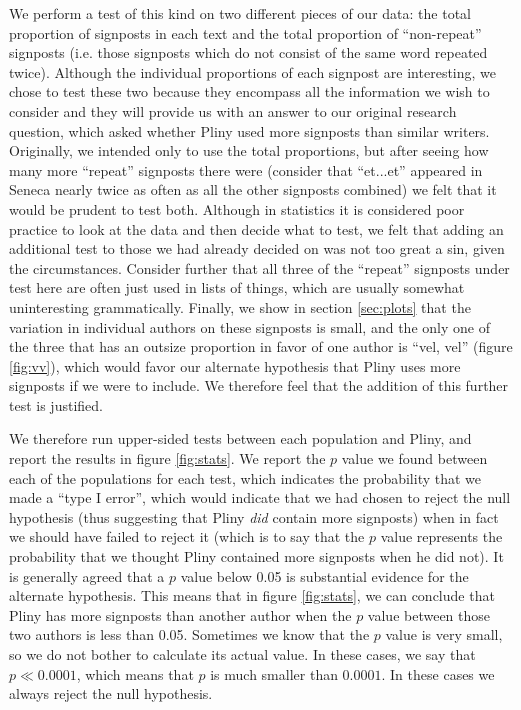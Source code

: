 We perform a test of this kind on two different pieces of our data: the total proportion of signposts in each text and the total proportion of ``non-repeat'' signposts (i.e. those signposts which do not consist of the same word repeated twice). Although the individual proportions of each signpost are interesting, we chose to test these two because they encompass all the information we wish to consider and they will provide us with an answer to our original research question, which asked whether Pliny used more signposts than similar writers. Originally, we intended only to use the total proportions, but after seeing how many more ``repeat'' signposts there were (consider that ``et...et'' appeared in Seneca nearly twice as often as all the other signposts combined) we felt that it would be prudent to test both. Although in statistics it is considered poor practice to look at the data and then decide what to test, we felt that adding an additional test to those we had already decided on was not too great a sin, given the circumstances. Consider further that all three of the ``repeat'' signposts under test here are often just used in lists of things, which are usually somewhat uninteresting grammatically. Finally, we show in section \ref{sec:plots} that the variation in individual authors on these signposts is small, and the only one of the three that has an outsize proportion in favor of one author is ``vel, vel'' (figure \ref{fig:vv}), which would favor our alternate hypothesis that Pliny uses more signposts if we were to include. We therefore feel that the addition of this further test is justified.

We therefore run upper-sided tests between each population and Pliny, and report the results in figure \ref{fig:stats}. We report the $p$ value we found between each of the populations for each test, which indicates the probability that we made a ``type I error'', which would indicate that we had chosen to reject the null hypothesis (thus suggesting that Pliny \textit{did} contain more signposts) when in fact we should have failed to reject it (which is to say that the $p$ value represents the probability that we thought Pliny contained more signposts when he did not). It is generally agreed that a $p$ value below 0.05 is substantial evidence for the alternate hypothesis. This means that in figure \ref{fig:stats}, we can conclude that Pliny has more signposts than another author when the $p$ value between those two authors is less than 0.05. Sometimes we know that the $p$ value is very small, so we do not bother to calculate its actual value. In these cases, we say that $p \ll 0.0001$, which means that $p$ is much smaller than $0.0001$. In these cases we always reject the null hypothesis.


